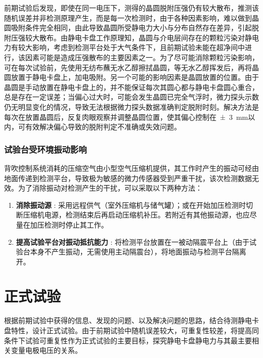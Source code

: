 前期试验后发现，即使在同一电压下，测得的晶圆脱附压强仍有较大散布，推测该随机误差并非检测原理产生，而是每一次检测时，由于各种因素影响，难以做到晶圆吸附条件完全相同，由此导致晶圆所受静电力大小与分布自然存在差异，引起脱附压强较大散布。由静电卡盘工作原理知，晶圆与介电层间存在的颗粒污染对静电力有较大影响，考虑到检测平台处于大气条件下，且前期试验未能在超净间中进行，该因素可能是造成压强散布的主要因素之一。为了尽可能消除颗粒污染影响，可在每次试验前，先使用无纺布蘸无水乙醇擦拭晶圆，等无水乙醇挥发后，再将晶圆放置于静电卡盘上，加电吸附。另一个可能的影响因素是晶圆放置的位置。由于晶圆是手动放置在静电卡盘上的，并不能保证每次其圆心都与静电卡盘圆心重合，总是存在一定误差；当偏心过大时，可能会发生晶圆已完全气浮时，微力探头示数仍无明显变化的情况，导致无法根据微力探头数据准确判定脱附时刻。解决方法是每次在放置晶圆后，反复肉眼观察并调整晶圆位置，使其偏心控制在\SI{\pm 3}{\mm}以内，可有效解决偏心导致的脱附判定不准确或失效问题。

\subsubsection{试验台受环境振动影响}\label{sec:exp-pilot-fix-vib}

背吹控制系统消耗的压缩空气由小型空气压缩机提供，其工作时产生的振动可经由地面传递到检测平台，导致极为敏感的微力传感器受到严重干扰，该次检测数据无效。为了消除振动对检测产生的干扰，可以采取以下两种方法：

\begin{enumerate}
  \item \textbf{消除振动源} :
    采用远程供气（室外压缩机与储气罐）；或在开始加压检测时切断压缩机电源，检测结束后再启动压缩机补压。若附近有其他振动源，也应尽量在加压检测时停止其工作。
  \item \textbf{提高试验平台对振动抵抗能力} :
    将检测平台放置在一被动隔震平台上（由于试验台本身不产生振动，无需使用主动隔震台），将地面振动与检测平台隔离开。
\end{enumerate}



\section{正式试验}\label{sec:exp-main}

根据前期试验中获得的信息、发现的问题、以及解决问题的思路，结合待测静电卡盘特性，设计正式试验。由于前期试验中随机误差较大，可重复性较差，将提高同条件下试验可重复性作为正式试验的主要目标，探究静电卡盘静电力与其最主要相关变量电极电压的关系。


